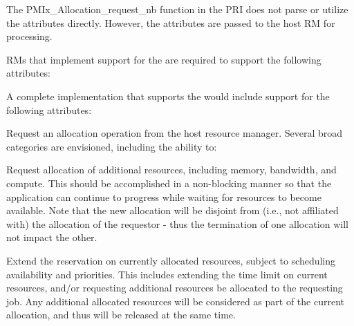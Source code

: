 \priattr
The PMIx_Allocation_request_nb function in the \ac{PRI} does not parse or utilize the attributes directly. However, the attributes are passed to the host RM for processing.

\reqattr
\acp{RM} that implement support for the  are required to support the following attributes:


\optattr
A complete implementation that supports the  would include support for the following attributes:



\descr

Request an allocation operation from the host resource manager.
Several broad categories are envisioned, including the ability to:

\begin{compactitem}
%
\item Request allocation of additional resources, including memory, bandwidth, and compute.
This should be accomplished in a non-blocking manner so that the application can continue to progress while waiting for resources to become available.
Note that the new allocation will be disjoint from (i.e., not affiliated with) the allocation of the requestor - thus the termination of one allocation will not impact the other.
%
\item Extend the reservation on currently allocated resources, subject to scheduling availability and priorities.
This includes extending the time limit on current resources, and/or requesting additional resources be allocated to the requesting job.
Any additional allocated resources will be considered as part of the current allocation, and thus will be released at the same time.
%
\end{compactitem}


\subsection{}

